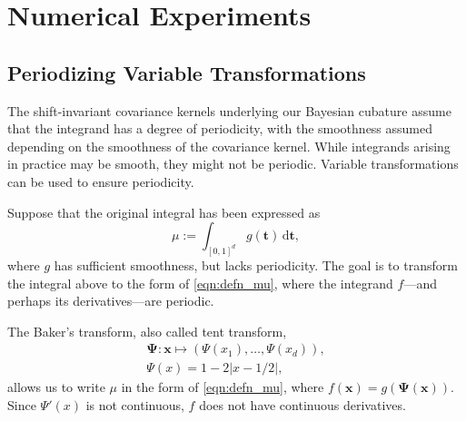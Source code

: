 \documentclass[twocolumn]{svjour3}          %
\newcommand{\bm}[1]{\boldsymbol{#1}}
\newcommand{\dif}[1]{\text{d}{#1}}
\newcommand{\vt}{\bm{t}}
\newcommand{\vx}{\bm{x}}
\newcommand{\vPsi}{\boldsymbol{\Psi}}
\def\abs#1{\ensuremath{\left \lvert #1 \right \rvert}}
\begin{document}
\section{Numerical Experiments} \label{sec:NumExp}

\subsection{Periodizing Variable Transformations}
\label{period_var_tx}
The shift-invariant covariance kernels underlying our Bayesian cubature  assume that the integrand has a degree of periodicity, with the smoothness assumed depending on the smoothness of the covariance kernel.  While integrands arising in practice may be smooth, they might not be periodic.  Variable transformations can be used to ensure periodicity.

Suppose that the original integral has been expressed as 
\begin{equation*}
\mu := \int_{[0,1]^d} g(\vt) \, \dif \vt,
\end{equation*}
where $g$ has sufficient smoothness, but lacks periodicity.  
The goal is to transform the integral above to the form of \eqref{eqn:defn_mu}, where the integrand $f$---and perhaps its derivatives---are  periodic.  

The Baker's transform, also called tent transform,
\begin{multline} \label{eq:bakerTrans}
\vPsi: \vx \mapsto (\Psi(x_1),  \ldots, \Psi(x_d)), \\ \Psi(x)  =1 - 2 \abs{x - 1/2},
\end{multline}
allows us to write $\mu$ in the form of \eqref{eqn:defn_mu}, where $f(\vx) = g(\vPsi(\vx))$.  Since  $\Psi'(x)$ is not continuous, $f$ does not have continuous derivatives. 
\end{document}
